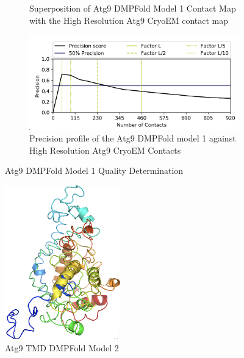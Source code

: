 \begin{figure}[htb]
\begin{subfigure}{0.25\textwidth}
  \caption{Superposition of Atg9 DMPFold Model 1 Contact Map with the High Resolution Atg9 CryoEM contact map}
  \label{fig:1}
\end{subfigure}\hfil %
\begin{subfigure}{0.25\textwidth}
  \includegraphics[width=\linewidth]{Modelling of Atg9/prec_dmp_m1.png}
  \caption{Precision profile of the Atg9 DMPFold model 1 against High Resolution Atg9 CryoEM Contacts}
  \label{fig:1}
\end{subfigure}\hfil %
\caption{Atg9 DMPFold Model 1 Quality Determination}
\small
\label{fig:atg9_dmp_m1_quality}
\end{figure}

\begin{figure}[th!]
    \centering
    \includegraphics[width=50mm, scale=0.5]{Modelling of Atg9/dmp_m2.png}
    \caption{Atg9 TMD DMPFold Model 2}
    \label{fig:4dmp_m2}
    \small
\end{figure}

